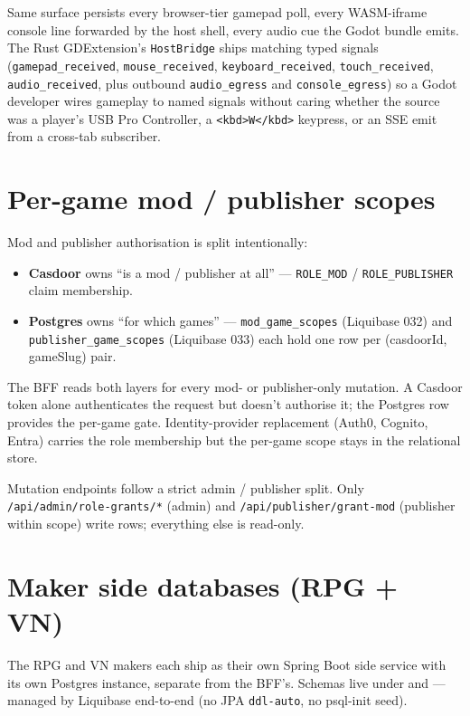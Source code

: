 Same surface persists every browser-tier gamepad poll, every
WASM-iframe console line forwarded by the host shell, every
audio cue the Godot bundle emits. The Rust GDExtension's
\texttt{HostBridge} ships matching typed signals
(\texttt{gamepad\_received}, \texttt{mouse\_received},
\texttt{keyboard\_received}, \texttt{touch\_received},
\texttt{audio\_received}, plus outbound \texttt{audio\_egress} and
\texttt{console\_egress}) so a Godot developer wires gameplay to
named signals without caring whether the source was a player's
USB Pro Controller, a \texttt{<kbd>W</kbd>} keypress, or an SSE
emit from a cross-tab subscriber.

\section{Per-game mod / publisher scopes}

Mod and publisher authorisation is split intentionally:

\begin{itemize}
  \item \textbf{Casdoor} owns ``is a mod / publisher at all'' ---
        \texttt{ROLE\_MOD} / \texttt{ROLE\_PUBLISHER} claim membership.
  \item \textbf{Postgres} owns ``for which games'' ---
        \texttt{mod\_game\_scopes} (Liquibase 032) and
        \texttt{publisher\_game\_scopes} (Liquibase 033) each hold one
        row per (casdoorId, gameSlug) pair.
\end{itemize}

The BFF reads both layers for every mod- or publisher-only mutation. A
Casdoor token alone authenticates the request but doesn't authorise it;
the Postgres row provides the per-game gate. Identity-provider replacement
(Auth0, Cognito, Entra) carries the role membership but the per-game
scope stays in the relational store.

Mutation endpoints follow a strict admin / publisher split. Only
\texttt{/api/admin/role-grants/*} (admin) and
\texttt{/api/publisher/grant-mod} (publisher within scope) write rows;
everything else is read-only.

\section{Maker side databases (RPG + VN)}

The RPG and VN makers each ship as their own Spring Boot side service
with its own Postgres instance, separate from the BFF's. Schemas live
under  and
 --- managed by
Liquibase end-to-end (no JPA \texttt{ddl-auto}, no psql-init seed).

